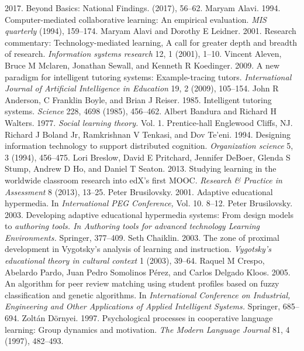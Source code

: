 \begin{multicols}{2}
\begin{thebibliography}{99}
 2017. Beyond Basics: National Findings. (2017), 56–62.
 Maryam Alavi. 1994. Computer-mediated collaborative learning: An empirical evaluation. \textit{MIS quarterly} (1994), 159–174.
 Maryam Alavi and Dorothy E Leidner. 2001. Research commentary: Technology-mediated learning, A call for greater depth and breadth of research. \textit{Information systems research} 12, 1 (2001), 1–10.
 Vincent Aleven, Bruce M Mclaren, Jonathan Sewall, and Kenneth R Koedinger. 2009. A new paradigm for intelligent tutoring systems: Example-tracing tutors. \textit{International Journal of Artificial Intelligence in Education} 19, 2 (2009), 105–154.
 John R Anderson, C Franklin Boyle, and Brian J Reiser. 1985. Intelligent tutoring systems. \textit{Science} 228, 4698 (1985), 456–462.
 Albert Bandura and Richard H Walters. 1977. \textit{Social learning theory.} Vol. 1. Prentice-hall Englewood Cliffs, NJ.
 Richard J Boland Jr, Ramkrishnan V Tenkasi, and Dov Te’eni. 1994. Designing information technology to support distributed cognition. \textit{Organization science} 5, 3 (1994), 456–475.
 Lori Breslow, David E Pritchard, Jennifer DeBoer, Glenda S Stump, Andrew D Ho, and Daniel T Seaton. 2013. Studying learning in the worldwide classroom research into edX’s first MOOC. \textit{Research \& Practice in Assessment} 8 (2013), 13–25.
 Peter Brusilovsky. 2001. Adaptive educational hypermedia. In \textit{International PEG Conference,} Vol. 10. 8–12.
 Peter Brusilovsky. 2003. Developing adaptive educational hypermedia systems: From design models to \textit{authoring tools. In Authoring tools for advanced technology Learning Environments.} Springer, 377–409.
 Seth Chaiklin. 2003. The zone of proximal development in Vygotsky's analysis of learning and instruction. \textit{Vygotsky's educational theory in cultural context} 1 (2003), 39–64.
 Raquel M Crespo, Abelardo Pardo, Juan Pedro Somolinos Pérez, and Carlos Delgado Kloos. 2005. An algorithm for peer review matching using student profiles based on fuzzy classification and genetic algorithms. In \textit{International Conference on Industrial, Engineering and Other Applications of Applied Intelligent Systems.} Springer, 685–694.
 Zoltán Dörnyei. 1997. Psychological processes in cooperative language learning: Group dynamics and motivation. \textit{The Modern Language Journal} 81, 4 (1997), 482–493.

\end{thebibliography}
\end{multicols}
